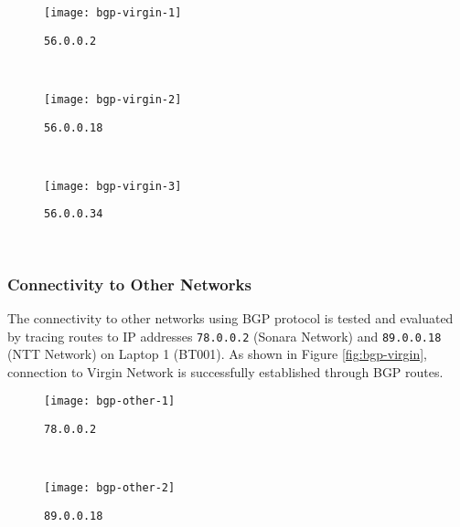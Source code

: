 \begin{figure*}[ht!]
    \centering
    \begin{subfigure}[b]{\textwidth}
        \centering
        \texttt{[image: bgp-virgin-1]}
        \caption{\texttt{56.0.0.2}}
    \end{subfigure}
    ~
    \begin{subfigure}[b]{\textwidth}
        \centering
        \texttt{[image: bgp-virgin-2]}
        \caption{\texttt{56.0.0.18}}
    \end{subfigure}
    ~
    \begin{subfigure}[b]{\textwidth}
        \centering
        \texttt{[image: bgp-virgin-3]}
        \caption{\texttt{56.0.0.34}}
    \end{subfigure}
    ~
    \caption{Tracing IPv4 Routes to Virgin Network on Laptop 1 (BT001) using \texttt{traceroute}.}
    \label{fig:bgp-virgin}
\end{figure*}



\clearpage


\subsubsection{Connectivity to Other Networks}
The connectivity to other networks using BGP protocol is tested and evaluated by tracing routes to IP addresses \texttt{78.0.0.2} (Sonara Network) and \texttt{89.0.0.18} (NTT Network) on Laptop 1 (BT001). As shown in Figure \ref{fig:bgp-virgin}, connection to Virgin Network is successfully established through BGP routes.

\begin{figure*}[ht!]
    \centering
    \begin{subfigure}[b]{\textwidth}
        \centering
        \texttt{[image: bgp-other-1]}
        \caption{\texttt{78.0.0.2}}
    \end{subfigure}
    ~
    \begin{subfigure}[b]{\textwidth}
        \centering
        \texttt{[image: bgp-other-2]}
        \caption{\texttt{89.0.0.18}}
    \end{subfigure}
    \caption{Tracing IPv4 Routes to Other Networks on Laptop 1 (BT001) using \texttt{traceroute}.}
    \label{fig:bgp-virgin}
\end{figure*}



\clearpage


